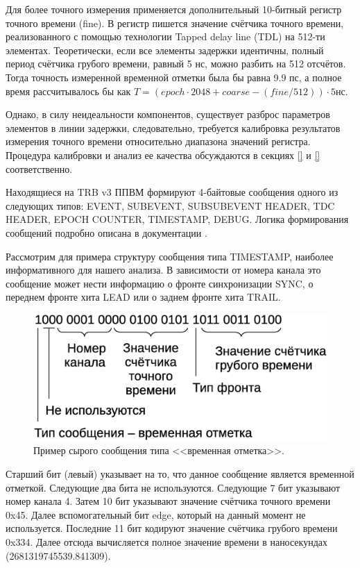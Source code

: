 Для более точного измерения применяется дополнительный 10-битный регистр точного времени (fine). В регистр пишется значение счётчика точного времени, реализованного с помощью технологии Tapped delay line (TDL) на 512-ти элементах. Теоретически, если все элементы задержки идентичны, полный период счётчика грубого времени, равный 5 нс, можно разбить на 512 отсчётов. Тогда точность измеренной временной отметки была бы равна 9.9 пс, а полное время рассчитывалось бы как $ T = (epoch \cdot 2048 + coarse - (fine/512)) \cdot 5 $нс.

Однако, в силу неидеальности компонентов, существует разброс параметров элементов в линии задержки, следовательно, требуется калибровка результатов измерения точного времени относительно диапазона значений регистра. Процедура калибровки и анализ ее качества обсуждаются в секциях \ref{} и \ref{} соответственно.

Находящиеся на TRB v3 ППВМ формируют 4-байтовые сообщения одного из следующих типов: EVENT, SUBEVENT, SUBSUBEVENT HEADER, TDC HEADER, EPOCH COUNTER, TIMESTAMP, DEBUG. Логика формирования сообщений подробно описана в документации \cite{}.

Рассмотрим для примера структуру сообщения типа TIMESTAMP, наиболее информативного для нашего анализа. В зависимости от номера канала это сообщение может нести информацию о фронте синхронизации SYNC, о переднем фронте хита LEAD или о заднем фронте хита TRAIL.

\begin{figure}
\includegraphics[width=1.0\textwidth]{pictures/8_Unpacking.eps}
\caption{Пример сырого сообщения типа <<временная отметка>>.}
\label{fig:Unpacking}
\end{figure}

Старший бит (левый) указывает на то, что данное сообщение является временной отметкой. Следующие два бита не используются. Следующие 7 бит указывают номер канала 4. Затем 10 бит указывают значение счётчика точного времени 0x45. Далее вспомогательный бит edge, который на данный момент не используется. Последние 11 бит кодируют значение счётчика грубого времени 0x334. Далее отсюда вычисляется полное значение времени в наносекундах (2681319745539.841309).

